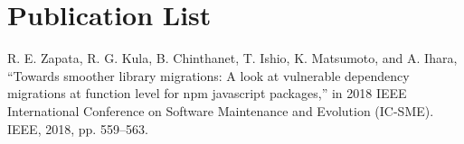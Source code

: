  \section*{\Large Publication List}
 \noindent [1] R. E. Zapata, R. G. Kula, B. Chinthanet, T. Ishio, K. Matsumoto, and A. Ihara, “Towards smoother library migrations: A look at vulnerable dependency migrations at function level for npm javascript packages,” in 2018 IEEE International Conference on Software Maintenance and Evolution (IC-SME). IEEE, 2018, pp. 559–563.